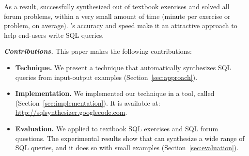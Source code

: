 As a result, \ourtool successfully synthesized \solexnum out of \exnum
textbook exercises and solved all \pnum forum problems, within a very
small amount of time (\avgtime minute per exercise or problem, on average).
\ourtool's accuracy and speed make it an attractive
approach to help end-users write SQL queries.


\vspace{1mm}
\noindent\textbf{\textit{Contributions.}}
This paper makes the following contributions:

\begin{itemize}

\item \textbf{Technique.} We present a technique that automatically
synthesizes SQL queries from input-output examples
(Section~\ref{sec:approach}).

\item \textbf{Implementation.} We implemented our technique in a
tool, called \ourtool (Section~\ref{sec:implementation}). It is
available at: \url{http://sqlsynthesizer.googlecode.com}.

\item \textbf{Evaluation.} We applied \ourtool
to \exnum textbook SQL exercises and \pnum 
SQL forum questions.
The experimental results show that \ourtool can synthesize
a wide range of SQL queries, and it does so with
small examples (Section~\ref{sec:evaluation}).
\end{itemize}
